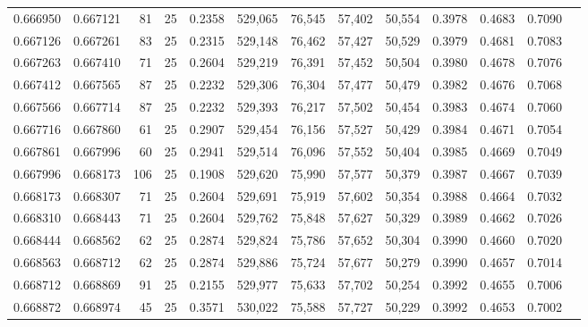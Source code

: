 \begin{tabular}{rrrrrrrrrrrrr}
0.666950 & 0.667121 &    81 &  25 &                                     0.2358 & 529,065 &  76,545 &  57,402 &  50,554 & 0.3978 & 0.4683 & 0.7090 \\
0.667126 & 0.667261 &    83 &  25 &                                     0.2315 & 529,148 &  76,462 &  57,427 &  50,529 & 0.3979 & 0.4681 & 0.7083 \\
0.667263 & 0.667410 &    71 &  25 &                                     0.2604 & 529,219 &  76,391 &  57,452 &  50,504 & 0.3980 & 0.4678 & 0.7076 \\
0.667412 & 0.667565 &    87 &  25 &                                     0.2232 & 529,306 &  76,304 &  57,477 &  50,479 & 0.3982 & 0.4676 & 0.7068 \\
0.667566 & 0.667714 &    87 &  25 &                                     0.2232 & 529,393 &  76,217 &  57,502 &  50,454 & 0.3983 & 0.4674 & 0.7060 \\
0.667716 & 0.667860 &    61 &  25 &                                     0.2907 & 529,454 &  76,156 &  57,527 &  50,429 & 0.3984 & 0.4671 & 0.7054 \\
0.667861 & 0.667996 &    60 &  25 &                                     0.2941 & 529,514 &  76,096 &  57,552 &  50,404 & 0.3985 & 0.4669 & 0.7049 \\
0.667996 & 0.668173 &   106 &  25 &                                     0.1908 & 529,620 &  75,990 &  57,577 &  50,379 & 0.3987 & 0.4667 & 0.7039 \\
0.668173 & 0.668307 &    71 &  25 &                                     0.2604 & 529,691 &  75,919 &  57,602 &  50,354 & 0.3988 & 0.4664 & 0.7032 \\
0.668310 & 0.668443 &    71 &  25 &                                     0.2604 & 529,762 &  75,848 &  57,627 &  50,329 & 0.3989 & 0.4662 & 0.7026 \\
0.668444 & 0.668562 &    62 &  25 &                                     0.2874 & 529,824 &  75,786 &  57,652 &  50,304 & 0.3990 & 0.4660 & 0.7020 \\
0.668563 & 0.668712 &    62 &  25 &                                     0.2874 & 529,886 &  75,724 &  57,677 &  50,279 & 0.3990 & 0.4657 & 0.7014 \\
0.668712 & 0.668869 &    91 &  25 &                                     0.2155 & 529,977 &  75,633 &  57,702 &  50,254 & 0.3992 & 0.4655 & 0.7006 \\
0.668872 & 0.668974 &    45 &  25 &                                     0.3571 & 530,022 &  75,588 &  57,727 &  50,229 & 0.3992 & 0.4653 & 0.7002 \\

\end{tabular}
